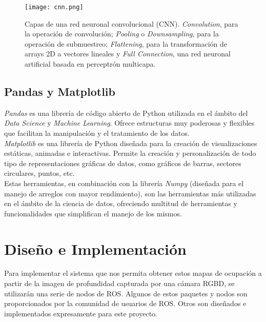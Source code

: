 \begin{figure}[h]
	\begin{center} 
		\texttt{[image: cnn.png]}
	\end{center}
	\caption{Capas de una red neuronal convolucional (CNN). \textit{Convolution}, para la operación de convolución; \textit{Pooling} o \textit{Downsampling}, para la operación de submuestreo;  \textit{Flattening}, para la  transformación de arrays 2D a vectores lineales y \textit{Full Connection}, una red neuronal artificial basada en perceptrón multicapa. \cite{foto_cnn}}
	\label{fig:cnn}
\end{figure}

\section{Pandas y Matplotlib}

\textit{Pandas} es una librería de código abierto de Python utilizada en el ámbito del \textit{Data Science} y \textit{Machine Learning}. Ofrece estructuras muy poderosas y flexibles que facilitan la manipulación y el tratamiento de los datos. \cite{pandas}\\

\textit{Matplotlib} es una librería de Python diseñada para la creación de visualizaciones estáticas, animadas e interactivas. Permite la creación y personalización de todo tipo de representaciones gráficas de datos, como gráficos de barras, sectores circulares, puntos, etc.\cite{matplotlib}\\

Estas herramientas, en combinación con la librería \textit{Numpy} (diseñada para el manejo de arreglos con mayor rendimiento), son las herramientas más utilizadas en el ámbito de la ciencia de datos, ofreciendo multitud de herramientas y funcionalidades que simplifican el manejo de los mismos.\\



\chapter{Diseño e Implementación}

Para implementar el sistema que nos permita obtener estos mapas de ocupación a partir de la imagen de profundidad capturada por una cámara RGBD, se utilizarán una serie de nodos de ROS. Algunos de estos paquetes y nodos son proporcionados por la comunidad de usuarios de ROS. Otros son diseñados e implementados expresamente para este proyecto.\\


